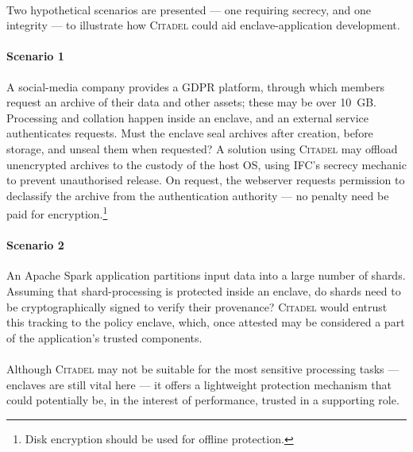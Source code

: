 \paragraph{} Two hypothetical scenarios are presented --- one requiring secrecy, and one integrity --- to illustrate how \textsc{Citadel} could aid enclave-application development.

\paragraph{Scenario 1} A social-media company provides a GDPR platform, through which members request an archive of their data and other assets; these may be over 10~GB. Processing and collation happen inside an enclave, and an external service authenticates requests. Must the enclave seal archives after creation, before storage, and unseal them when requested? A solution using \textsc{Citadel} may offload unencrypted archives to the custody of the host OS, using IFC's secrecy mechanic to prevent unauthorised release. On request, the webserver requests permission to declassify the archive from the authentication authority --- no penalty need be paid for encryption.\footnote{Disk encryption should be used for offline protection.}


\paragraph{Scenario 2} An Apache Spark application partitions input data into a large number of shards. Assuming that shard-processing is protected inside an enclave, do shards need to be cryptographically signed to verify their provenance? \textsc{Citadel} would entrust this tracking to the policy enclave, which, once attested may be considered a part of the application's trusted components.

\paragraph{} Although \textsc{Citadel} may not be suitable for the most sensitive processing tasks --- enclaves are still vital here --- it offers a lightweight protection mechanism that could potentially be, in the interest of performance, trusted in a supporting role.
